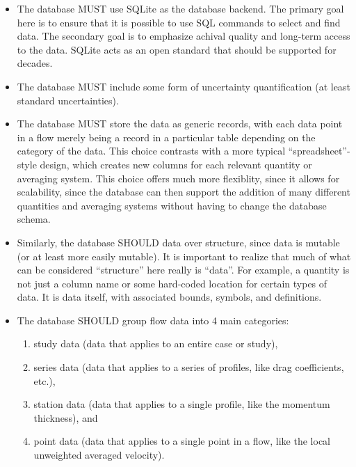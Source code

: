 \begin{itemize}

\item The database MUST use SQLite as the database backend.  The primary goal
here is to ensure that it is possible to use SQL commands to select and find
data.  The secondary goal is to emphasize achival quality and long-term access
to the data.  SQLite acts as an open standard that should be supported for
decades.

\item The database MUST include some form of uncertainty quantification (at
least standard uncertainties).

\item The database MUST store the data as generic records, with each data point
in a flow merely being a record in a particular table depending on the category
of the data.  This choice contrasts with a more typical ``spreadsheet''-style
design, which creates new columns for each relevant quantity or averaging
system.  This choice offers much more flexiblity, since it allows for
scalability, since the database can then support the addition of many different
quantities and averaging systems without having to change the database schema.

\item Similarly, the database SHOULD data over structure, since data is mutable
(or at least more easily mutable).  It is important to realize that much of
what can be considered ``structure'' here really is ``data''.  For example, a
quantity is not just a column name or some hard-coded location for certain
types of data.  It is data itself, with associated bounds, symbols, and
definitions.

\item The database SHOULD group flow data into 4 main categories:

    \begin{enumerate}

    \item study data (data that applies to an entire case or study),

    \item series data (data that applies to a series of profiles, like drag
    coefficients, etc.),

    \item station data (data that applies to a single profile, like the
    momentum thickness), and

    \item point data (data that applies to a single point in a flow, like the
    local unweighted averaged velocity).


\end{enumerate}
\end{itemize}
